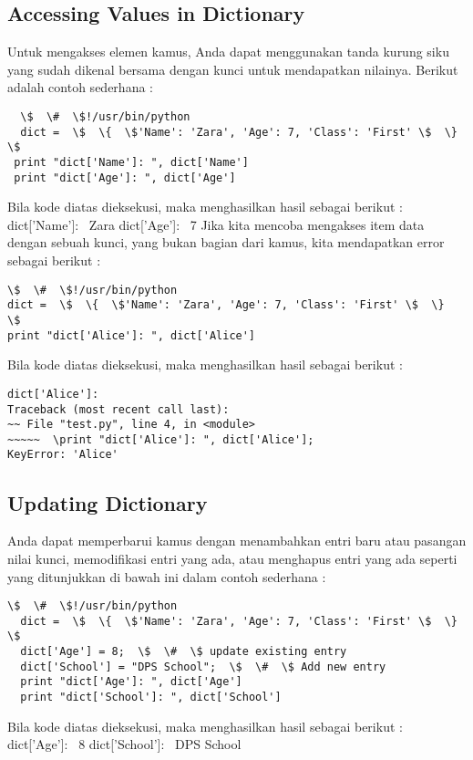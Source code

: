 \subsection{Accessing Values in Dictionary}
Untuk mengakses elemen kamus, Anda dapat menggunakan tanda kurung siku yang sudah dikenal bersama dengan kunci untuk mendapatkan nilainya. Berikut adalah contoh sederhana :
\begin{verbatim}  
  \$  \#  \$!/usr/bin/python
  dict =  \$  \{  \$'Name': 'Zara', 'Age': 7, 'Class': 'First' \$  \}  \$ 
 print "dict['Name']: ", dict['Name'] 
 print "dict['Age']: ", dict['Age']
\end{verbatim}
Bila kode diatas dieksekusi, maka menghasilkan hasil sebagai berikut :
dict['Name']:~ Zara
dict['Age']:~ 7 
Jika kita mencoba mengakses item data dengan sebuah kunci, yang bukan bagian dari kamus, kita mendapatkan error sebagai berikut :
\begin{verbatim} 
\$  \#  \$!/usr/bin/python
dict =  \$  \{  \$'Name': 'Zara', 'Age': 7, 'Class': 'First' \$  \}  \$ 
print "dict['Alice']: ", dict['Alice']
\end{verbatim}
Bila kode diatas dieksekusi, maka menghasilkan hasil sebagai berikut :
\begin{verbatim}
dict['Alice']: 
Traceback (most recent call last):
~~ File "test.py", line 4, in <module>
~~~~~  \print "dict['Alice']: ", dict['Alice']; 
KeyError: 'Alice' 
\end{verbatim}

\subsection{Updating Dictionary}
Anda dapat memperbarui kamus dengan menambahkan entri baru atau pasangan nilai kunci, memodifikasi entri yang ada, atau menghapus entri yang ada seperti yang ditunjukkan di bawah ini dalam contoh sederhana :
\begin{verbatim}
\$  \#  \$!/usr/bin/python 
  dict =  \$  \{  \$'Name': 'Zara', 'Age': 7, 'Class': 'First' \$  \}  \$ 
  dict['Age'] = 8;  \$  \#  \$ update existing entry
  dict['School'] = "DPS School";  \$  \#  \$ Add new entry
  print "dict['Age']: ", dict['Age']
  print "dict['School']: ", dict['School']
\end{verbatim}
Bila kode diatas dieksekusi, maka menghasilkan hasil sebagai berikut : 
  dict['Age']:~ 8 
  dict['School']:~ DPS School 
  
